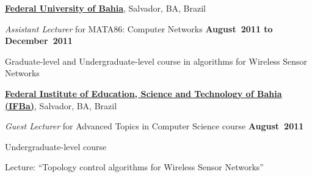 \documentclass[10pt]{article}
\newcommand{\halfblankline}{\quad\vspace{-0.5\baselineskip}\pagebreak[3]}
\begin{document}
\href{http://www.ufba.br/}{\textbf{Federal University of Bahia}},
Salvador, BA, Brazil
\begin{outerlist}

\item[] \textit{Assistant Lecturer} for MATA86: Computer Networks
    \hfill \textbf{August~2011 to December~2011}
    \begin{innerlist}
        \item Graduate-level and Undergraduate-level course in algorithms for 
Wireless Sensor Networks
    \end{innerlist}

\end{outerlist}

\halfblankline

\href{http://ifba.edu.br/}{\textbf{Federal Institute of Education, Science and Technology of Bahia (IFBa)}},
Salvador, BA, Brazil
\begin{outerlist}

\item[] \textit{Guest Lecturer} for Advanced Topics in Computer Science course
    \hfill \textbf{August~2011}
    \begin{innerlist}
        \item Undergraduate-level course
        \item Lecture: ``Topology control algorithms for Wireless Sensor Networks''
    \end{innerlist}
\end{outerlist}
\end{document}
